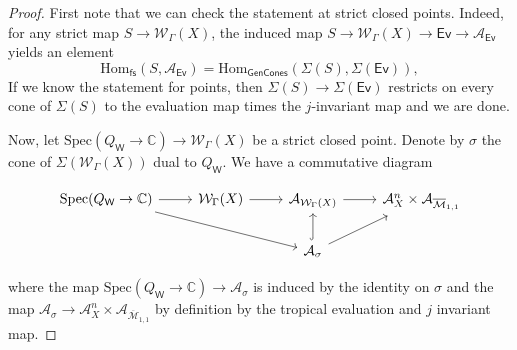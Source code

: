 \documentclass{article}
\def\Ev{{\mathsf{Ev}}}
\def\cW{\mathcal{W}}
\def\oM{\overline{\mathcal{M}}}
\def\C{\mathbb{C}}
\def\WG{\mathcal{W}_{\Gamma}}
\newcommand{\W}{\mathsf{W}}
\begin{document}
\begin{proof}
    First note that we can check the statement at strict closed points. Indeed, for any strict map $S \to \WG(X)$, the induced map $S \to  \cW_{\Gamma}(X) \to \Ev \to \mathcal{A}_{\Ev}$ yields an element
\begin{equation}\label{eqn: homo-to-Artin-fans}
\mathrm{Hom}_{\mathsf{fs}}(S,\mathcal{A}_{\Ev})
=
\mathrm{Hom}_{\mathsf{GenCones}}(\Sigma(S), \Sigma(\Ev)),
\end{equation}
If we know the statement for points, then $\Sigma(S) \to \Sigma(\Ev)$ restricts on every cone of $\Sigma(S)$ to the evaluation map times the $j$-invariant map and we are done.
    
    Now, let $\mathrm{Spec}(Q_\W \to\C) \to \WG(X)$ be a strict closed point. Denote by $\sigma$ the cone of $\Sigma(\WG(X))$ dual to $Q_\W$. We have a commutative diagram 

    \begin{equation*}\label{eqn:full-diagram}
    \begin{tikzcd}
    \mathrm{Spec}(Q_\W \to \C)
    \arrow[r]
    \arrow[drr]
    & \WG(X)
    \arrow[r]
    & \mathcal{A}_{\WG(X)}
    \arrow[r]
    & \mathcal{A}_X^n \times \mathcal{A}_{\oM_{1,1}}
    \\
    & 
    & \mathcal{A}_{\sigma}
    \arrow[u, hook]
    \arrow[ur]
    \end{tikzcd}
    \end{equation*}

    where the map $\mathrm{Spec}(Q_\W \to \C) \to  \mathcal{A}_{\sigma}$ is induced by the identity on $\sigma$ and the map $\mathcal{A}_{\sigma} \to \mathcal{A}_X^n \times \mathcal{A}_{\oM_{1,1}}$ by definition by the tropical evaluation and $j$ invariant map.


\end{proof}
\end{document}
